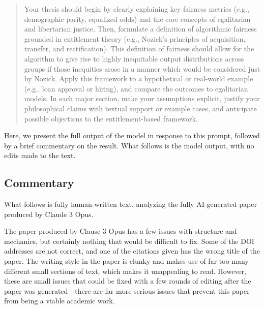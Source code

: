 \begin{quote}
    Your thesis should begin by clearly explaining key fairness metrics
    (e.g., demographic parity, equalized odds) and the core concepts of
    egalitarian and libertarian justice. Then, formulate a definition of
    algorithmic fairness grounded in entitlement theory (e.g., Nozick’s
    principles of acquisition, transfer, and rectification). This
    definition of fairness should allow for the algorithm to give rise
    to highly inequitable output distributions across groups if those
    inequities arose in a manner which would be considered just by
    Nozick. Apply this framework to a hypothetical or real-world example
    (e.g., loan approval or hiring), and compare the outcomes to
    egalitarian models. In each major section, make your assumptions
    explicit, justify your philosophical claims with textual support or
    example cases, and anticipate possible objections to the
    entitlement-based framework.
\end{quote}

Here, we present the full output of the model in response to this prompt,
followed by a brief commentary on the result. What follows is the model output,
with no edits made to the text.

\setcounter{section}{0}
\clearpage

\clearpage
\setcounter{section}{8}

\subsection{Commentary}

What follows is fully human-written text, analyzing the fully AI-generated paper
produced by Claude 3 Opus.

The paper produced by Clause 3 Opus has a few issues with structure and
mechanics, but certainly nothing that would be difficult to fix. Some of the DOI
addresses are not correct, and one of the citations given has the wrong title
of the paper. The writing style in the paper is clunky and makes use of far too
many different small sections of text, which makes it unappealing to read. 
However, these are small issues that could be fixed with a few rounds of editing
after the paper was generated—there are far more serious issues that prevent
this paper from being a viable academic work.

